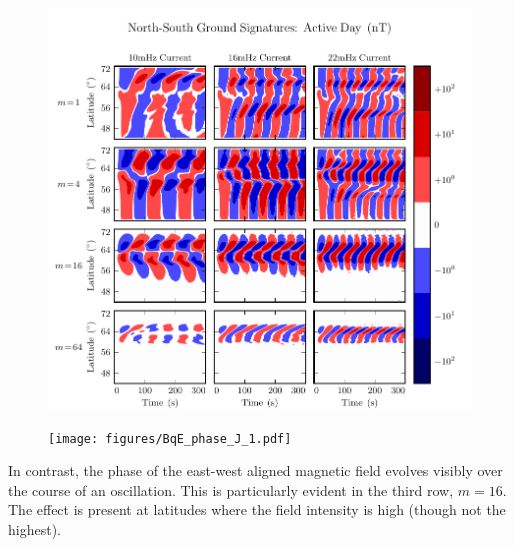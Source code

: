 \begin{figure}[H]
    \centering
    \includegraphics[width=\textwidth]{figures/BqE_J_1.pdf}
    \caption[North-South Ground Signatures: Active Day]{}
    \label{fig_BqE_J_1}
\end{figure}

\begin{figure}[H]
    \centering
    \texttt{[image: figures/BqE\_phase\_J\_1.pdf]}
    \caption[North-South Ground Signature Phases: Active Day]{}
    \label{fig_BqE_phase_J_1}
\end{figure}

In contrast, the phase of the east-west aligned magnetic field evolves visibly over the course of an oscillation. This is particularly evident in the third row, $m=16$. The effect is present at latitudes where the field intensity is high (though not the highest). 


